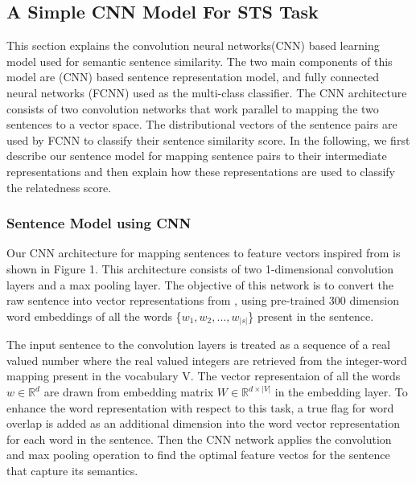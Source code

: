 \documentclass[12pt]{report} %
\begin{document}
	\subsection{A Simple CNN Model For STS Task}
		This section explains the convolution neural networks(CNN) based learning model used for semantic sentence similarity. The two main components of this model are (CNN) based sentence representation model, and fully connected neural networks (FCNN) used as the multi-class classifier. The CNN architecture consists of two convolution networks that work parallel to mapping the two sentences to a vector space. The distributional vectors of the sentence pairs are used by FCNN to classify their sentence similarity score. In the following, we first describe our sentence model for mapping sentence pairs to their intermediate representations and then explain how these representations are used to classify the relatedness score.
	
	\subsubsection*{Sentence Model using CNN}
	Our CNN architecture for mapping sentences to feature
	vectors inspired from \cite{shao2017hcti} is shown in Figure 1. This architecture consists of two 1-dimensional convolution layers and a max pooling layer. The objective of this network is to convert the raw sentence into vector representations from \cite{pennington2014glove}, using pre-trained 300 dimension word embeddings of all the words \{$w_{1}, w_{2},...,w_{|s|}$\} present in the sentence.
	
	The input sentence to the convolution layers is treated as a sequence of a real valued number where the real valued integers are retrieved from the integer-word mapping present in the vocabulary V. The vector representaion of all the words $ w \in \mathbb{R}^{d}  $ are drawn from embedding matrix  $ W \in \mathbb{R}^{d \times |V|} $ in the embedding layer. To enhance the word representation with respect to this task, a true flag for word overlap is added as an additional dimension into the word vector representation for each word in the sentence. Then the CNN network applies the convolution and max pooling operation to find the optimal feature vectos for the sentence that capture its semantics. 
	
\end{document}
